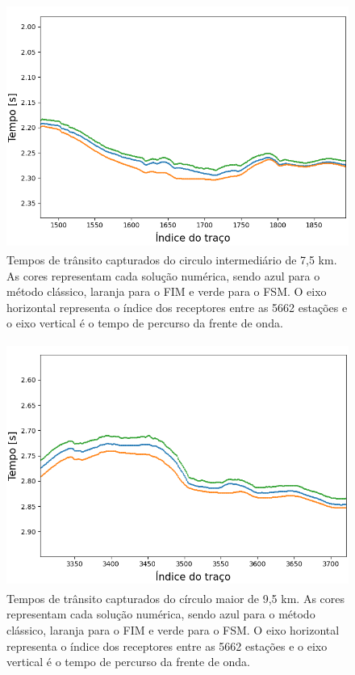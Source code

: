 \begin{figure}[H]
	\centering
	\includegraphics[height=8cm,width=13cm]{Imgs/Resultados/complex_w2.png}	
	\caption{Tempos de trânsito capturados do circulo intermediário de 7,5 km. As cores representam cada solução numérica, sendo azul para o método clássico, laranja para o FIM e verde para o FSM. O eixo horizontal representa o índice dos receptores entre as 5662 estações e o eixo vertical é o tempo de percurso da frente de onda.}
	\label{fig:overthrust_mid_circle}
\end{figure}

\begin{figure}[H]
	\centering
	\includegraphics[height=8cm,width=13cm]{Imgs/Resultados/complex_w3.png} \newline 
	
	\caption{Tempos de trânsito capturados do círculo maior de 9,5 km. As cores representam cada solução numérica, sendo azul para o método clássico, laranja para o FIM e verde para o FSM. O eixo horizontal representa o índice dos receptores entre as 5662 estações e o eixo vertical é o tempo de percurso da frente de onda.}
	\label{fig:overthrust_outer_circle}
\end{figure}

